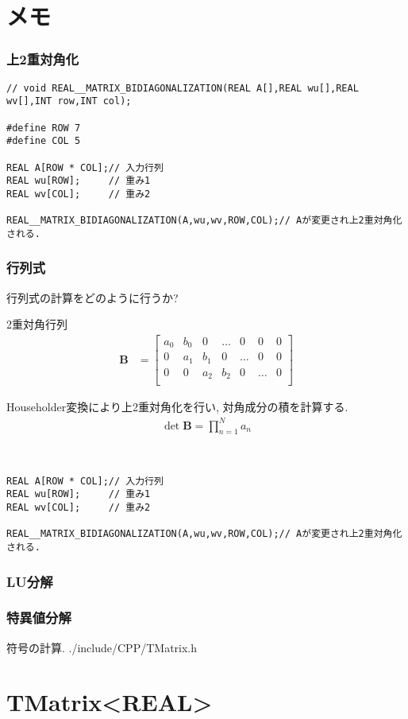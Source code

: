 \documentclass[a4j]{jsarticle}
\begin{document}
\section{メモ}

\subsubsection{上2重対角化}
\begin{lstlisting}[caption=上2重対角化,label=ほげ]
// void REAL__MATRIX_BIDIAGONALIZATION(REAL A[],REAL wu[],REAL wv[],INT row,INT col);

#define ROW 7
#define COL 5

REAL A[ROW * COL];// 入力行列
REAL wu[ROW];     // 重み1
REAL wv[COL];     // 重み2

REAL__MATRIX_BIDIAGONALIZATION(A,wu,wv,ROW,COL);// Aが変更され上2重対角化される. 

\end{lstlisting}

\subsubsection{行列式}
行列式の計算をどのように行うか?

2重対角行列
\begin{align}
\bm{B}&=
\begin{bmatrix}
a_{0}&b_{0}&0&\ldots &0&0&0\\
0&a_{1}&b_{1}&0&\ldots &0&0\\
0&0&a_{2}&b_{2}&0&\ldots &0\\
\end{bmatrix}
\end{align}

Householder変換により上2重対角化を行い, 対角成分の積を計算する. 
\begin{align}
\det \bm{B}=\prod _{n=1}^{N}a_{n}
\end{align}


\begin{lstlisting}[caption=上2重対角化,label=ほげ]


REAL A[ROW * COL];// 入力行列
REAL wu[ROW];     // 重み1
REAL wv[COL];     // 重み2

REAL__MATRIX_BIDIAGONALIZATION(A,wu,wv,ROW,COL);// Aが変更され上2重対角化される. 

\end{lstlisting}


\subsubsection{LU分解}
\subsubsection{特異値分解}
符号の計算. 
./include/CPP/TMatrix.h




\section{TMatrix<REAL>}




\end{document}
